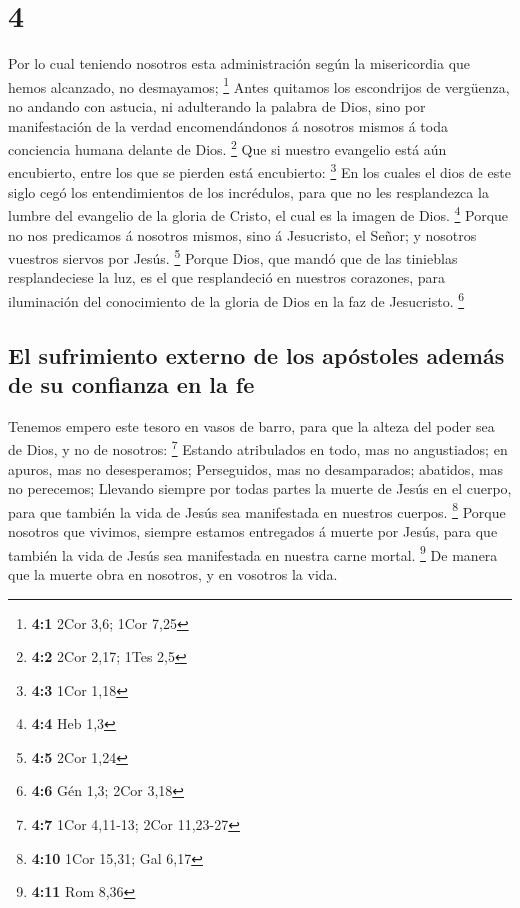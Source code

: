 \hypertarget{section-3}{%
\section{4}\label{section-3}}

 Por lo cual teniendo nosotros esta administración según
la misericordia que hemos alcanzado, no desmayamos; \footnote{\textbf{4:1}
  2Cor 3,6; 1Cor 7,25}  Antes quitamos los escondrijos de
vergüenza, no andando con astucia, ni adulterando la palabra de Dios,
sino por manifestación de la verdad encomendándonos á nosotros mismos á
toda conciencia humana delante de Dios. \footnote{\textbf{4:2} 2Cor
  2,17; 1Tes 2,5}  Que si nuestro evangelio está aún
encubierto, entre los que se pierden está encubierto: \footnote{\textbf{4:3}
  1Cor 1,18}  En los cuales el dios de este siglo cegó los
entendimientos de los incrédulos, para que no les resplandezca la lumbre
del evangelio de la gloria de Cristo, el cual es la imagen de Dios.
\footnote{\textbf{4:4} Heb 1,3}  Porque no nos predicamos
á nosotros mismos, sino á Jesucristo, el Señor; y nosotros vuestros
siervos por Jesús. \footnote{\textbf{4:5} 2Cor 1,24} 
Porque Dios, que mandó que de las tinieblas resplandeciese la luz, es el
que resplandeció en nuestros corazones, para iluminación del
conocimiento de la gloria de Dios en la faz de Jesucristo. \footnote{\textbf{4:6}
  Gén 1,3; 2Cor 3,18}

\hypertarget{el-sufrimiento-externo-de-los-apuxf3stoles-ademuxe1s-de-su-confianza-en-la-fe}{%
\subsection{El sufrimiento externo de los apóstoles además de su
confianza en la
fe}\label{el-sufrimiento-externo-de-los-apuxf3stoles-ademuxe1s-de-su-confianza-en-la-fe}}

 Tenemos empero este tesoro en vasos de barro, para que la
alteza del poder sea de Dios, y no de nosotros: \footnote{\textbf{4:7}
  1Cor 4,11-13; 2Cor 11,23-27}  Estando atribulados en
todo, mas no angustiados; en apuros, mas no desesperamos; 
Perseguidos, mas no desamparados; abatidos, mas no perecemos;
 Llevando siempre por todas partes la muerte de Jesús en
el cuerpo, para que también la vida de Jesús sea manifestada en nuestros
cuerpos. \footnote{\textbf{4:10} 1Cor 15,31; Gal 6,17} 
Porque nosotros que vivimos, siempre estamos entregados á muerte por
Jesús, para que también la vida de Jesús sea manifestada en nuestra
carne mortal. \footnote{\textbf{4:11} Rom 8,36}  De
manera que la muerte obra en nosotros, y en vosotros la vida.

